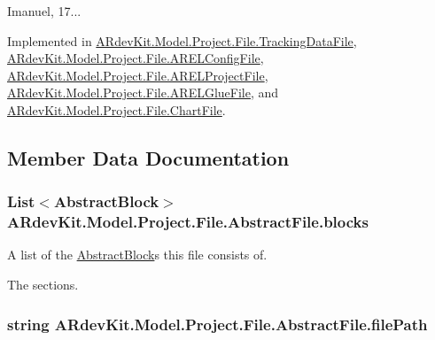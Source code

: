 Imanuel, 17... 

Implemented in \hyperlink{class_a_rdev_kit_1_1_model_1_1_project_1_1_file_1_1_tracking_data_file_a101d61e5cb5e45922adb70178838c5be}{A\-Rdev\-Kit.\-Model.\-Project.\-File.\-Tracking\-Data\-File}, \hyperlink{class_a_rdev_kit_1_1_model_1_1_project_1_1_file_1_1_a_r_e_l_config_file_a65bf5e667cb70e7cb9ae9a735ebba97f}{A\-Rdev\-Kit.\-Model.\-Project.\-File.\-A\-R\-E\-L\-Config\-File}, \hyperlink{class_a_rdev_kit_1_1_model_1_1_project_1_1_file_1_1_a_r_e_l_project_file_a021507cbd83b07773ffc1caf0645ca49}{A\-Rdev\-Kit.\-Model.\-Project.\-File.\-A\-R\-E\-L\-Project\-File}, \hyperlink{class_a_rdev_kit_1_1_model_1_1_project_1_1_file_1_1_a_r_e_l_glue_file_af2a513e4dce9fe965fca00612335de10}{A\-Rdev\-Kit.\-Model.\-Project.\-File.\-A\-R\-E\-L\-Glue\-File}, and \hyperlink{class_a_rdev_kit_1_1_model_1_1_project_1_1_file_1_1_chart_file_aa19af3145e3bbcb28683e7c77571d06f}{A\-Rdev\-Kit.\-Model.\-Project.\-File.\-Chart\-File}.



\subsection{Member Data Documentation}
\hypertarget{class_a_rdev_kit_1_1_model_1_1_project_1_1_file_1_1_abstract_file_a21e0333fb9d8eab8ebb039bd56ccabc9}{
\subsubsection[{blocks}]{\setlength{\rightskip}{0pt plus 5cm}List$<${\bf Abstract\-Block}$>$ A\-Rdev\-Kit.\-Model.\-Project.\-File.\-Abstract\-File.\-blocks\hspace{0.3cm}{\ttfamily [protected]}}}\label{class_a_rdev_kit_1_1_model_1_1_project_1_1_file_1_1_abstract_file_a21e0333fb9d8eab8ebb039bd56ccabc9}


A list of the \hyperlink{class_a_rdev_kit_1_1_model_1_1_project_1_1_file_1_1_abstract_block}{Abstract\-Block}s this file consists of. 

The sections. \hypertarget{class_a_rdev_kit_1_1_model_1_1_project_1_1_file_1_1_abstract_file_ad879e3a81860da8b72f2d9f61a18ab3b}{
\subsubsection[{file\-Path}]{\setlength{\rightskip}{0pt plus 5cm}string A\-Rdev\-Kit.\-Model.\-Project.\-File.\-Abstract\-File.\-file\-Path\hspace{0.3cm}{\ttfamily [protected]}}}\label{class_a_rdev_kit_1_1_model_1_1_project_1_1_file_1_1_abstract_file_ad879e3a81860da8b72f2d9f61a18ab3b}



